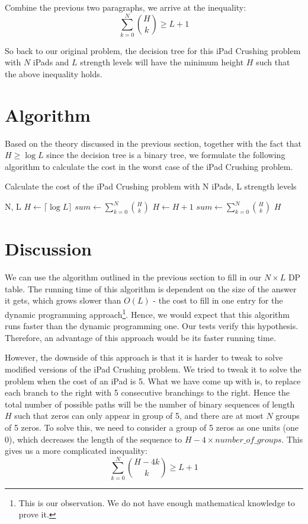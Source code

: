 \documentclass[12pt,a4paper,oneside]{report}
\begin{document}
Combine the previous two paragraphs, we arrive at the inequality: \[\sum_{k=0}^{N} {H \choose k} \geq L+1\]

So back to our original problem, the decision tree for this iPad Crushing problem with $N$ iPads and $L$ strength levels will have the minimum height $H$ such that the above inequality holds.

\section{Algorithm}
Based on the theory discussed in the previous section, together with the fact that $H \geq \log L$ since the decision tree is a binary tree, we formulate the following algorithm to calculate the cost in the worst case of the iPad Crushing problem.

\begin{algorithm}
        \caption{Calculate the cost of the iPad Crushing problem with N iPads, L strength levels}
        \begin{algorithmic}[1]
            \REQUIRE N, L
	\STATE $H \leftarrow \lceil \log L\rceil$
	\STATE $sum \leftarrow \sum_{k=0}^{N} {H \choose k}$
		\STATE $H \leftarrow H+1$
		\STATE $sum \leftarrow \sum_{k=0}^{N} {H \choose k}$
	\ENDWHILE
	\RETURN $H$
        \end{algorithmic}
\end{algorithm}

\section{Discussion}
We can use the algorithm outlined in the previous section to fill in our $N \times L$ DP table. The running time of this algorithm is dependent on the size of the answer it gets, which grows slower than $O(L)$ - the cost to fill in one entry for the dynamic programming approach\footnote{This is our observation. We do not have enough mathematical knowledge to prove it.}. Hence, we would expect that this algorithm runs faster than the dynamic programming one. Our tests verify this hypothesis. Therefore, an advantage of this approach would be its faster running time.

However, the downside of this approach is that it is harder to tweak to solve modified versions of the iPad Crushing problem. We tried to tweak it to solve the problem when the cost of an iPad is 5. What we have come up with is, to replace each branch to the right with 5 consecutive branchings to the right. Hence the total number of possible paths will be the number of binary sequences of length $H$ such that zeros can only appear in group of 5, and there are at most $N$ groups of 5 zeros. To solve this, we need to consider a group of 5 zeros as one units (one 0), which decreases the length of the sequence to $H - 4 \times number\_of\_groups$. This gives us a more complicated inequality: \[\sum_{k=0}^{N} {H-4k \choose k} \geq L+1\]
\end{document}
